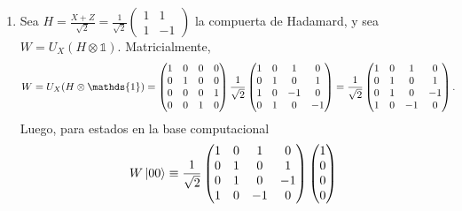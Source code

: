 \documentclass{scrartcl}
\newcommand{\inv}[1]{\frac{1}{#1}}
\DeclareRobustCommand{\[}{\begin{equation}}
\DeclareRobustCommand{\]}{\end{equation}}
\begin{document}
\begin{enumerate}
    
    
    \item Sea $H = \frac{X + Z}{\sqrt{2}} = \frac{1}{\sqrt{2}}\begin{pmatrix} 1 & 1 \\ 1 & -1 \end{pmatrix}$ la compuerta de Hadamard, y sea $W = U_X (H \otimes \mathds{1})$. Matricialmente,
    \begin{align}
        W &= U_X (H \otimes \mathds{1}) =
            \begin{pmatrix}
                \mqty{\mqty{\pmat{0}} & \mqty{\zmat{2}{2}} \\ \mqty{\zmat{2}{2}} & \mqty{\pmat{1}}}
            \end{pmatrix}
            \inv{\sqrt{2}}
            \begin{pmatrix}
                1 & 0 & 1 & 0 \\
                0 & 1 & 0 & 1 \\
                1 & 0 & -1 & 0 \\
                0 & 1 & 0 & -1
            \end{pmatrix}
            =
            \inv{\sqrt{2}}
            \begin{pmatrix}
                1 & 0 & 1 & 0 \\
                0 & 1 & 0 & 1 \\
                0 & 1 & 0 & -1 \\
                1 & 0 & -1 & 0
            \end{pmatrix}.
    \end{align}
    Luego, para estados en la base computacional
    \[
        W \ket{00} \equiv
        \inv{\sqrt{2}}
        \begin{pmatrix}
            1 & 0 & 1 & 0 \\
            0 & 1 & 0 & 1 \\
            0 & 1 & 0 & -1 \\
            1 & 0 & -1 & 0
        \end{pmatrix}
        \begin{pmatrix} 1 \\ 0 \\ 0 \\ 0 \end{pmatrix}
\]
\end{enumerate}
\end{document}
